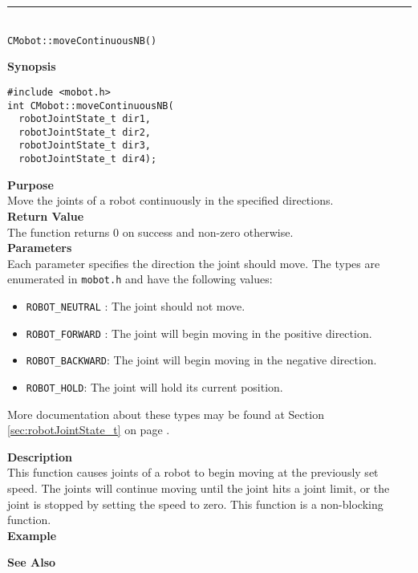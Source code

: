 \noindent
\vspace{5pt}
\rule{4.5in}{0.015in}\\
\noindent
{\LARGE \texttt{CMobot::moveContinuousNB()}}\\
{}

\noindent
{\bf Synopsis}
\vspace{-8pt}
\begin{verbatim}
#include <mobot.h>
int CMobot::moveContinuousNB(
  robotJointState_t dir1, 
  robotJointState_t dir2, 
  robotJointState_t dir3, 
  robotJointState_t dir4);
\end{verbatim}

\noindent
{\bf Purpose}\\
Move the joints of a robot continuously in the specified directions.\\

\noindent
{\bf Return Value}\\
The function returns 0 on success and non-zero otherwise.\\

\noindent
{\bf Parameters}\\
Each parameter specifies the direction the joint should move. The types
are enumerated in \texttt{mobot.h} and have the following values:
\begin{itemize}
\item \texttt{ROBOT\_NEUTRAL} : The joint should not move.
\item \texttt{ROBOT\_FORWARD} : The joint will begin moving in the positive direction.
\item \texttt{ROBOT\_BACKWARD}: The joint will begin moving in the negative direction.
\item \texttt{ROBOT\_HOLD}: The joint will hold its current position.
\end{itemize}
More documentation about these types may be found at Section
\ref{sec:robotJointState_t} on page
\pageref{sec:robotJointState_t}.

\noindent
{\bf Description}\\
This function causes joints of a robot to begin moving at the previously set
speed. The joints will continue moving until the joint hits a joint limit, or
the joint is stopped by setting the speed to zero. This function is a non-blocking
function.\\

\noindent
{\bf Example}\\
\noindent

\noindent
{\bf See Also}\\

